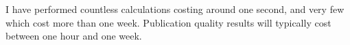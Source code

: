 I have performed 
countless calculations costing around one second, and very few which cost 
more than one week. Publication quality results will typically 
cost between one hour and one week.


















